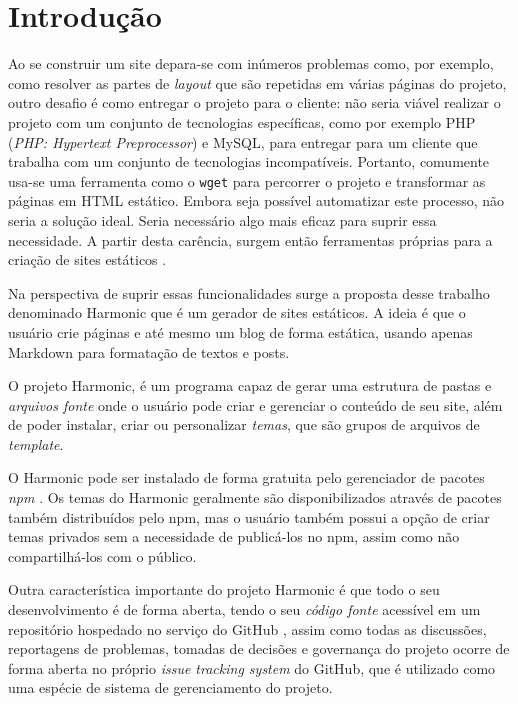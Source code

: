 \documentclass[ppginf, pep]{esinucpel}
\newcommand{\code}[1]{\texttt{#1}}
\begin{document}
\chapter{Introdução}

Ao se construir um site depara-se com inúmeros problemas como, por exemplo, como resolver as partes de \textit{layout} que são repetidas em várias páginas do projeto, outro desafio é como entregar o projeto para o cliente: não seria viável realizar o projeto com um conjunto de tecnologias específicas, como por exemplo PHP (\textit{PHP: Hypertext Preprocessor}) e MySQL, para entregar para um cliente que trabalha com um conjunto de tecnologias incompatíveis.
Portanto, comumente usa-se uma ferramenta como o \code{wget} para percorrer o projeto e transformar as páginas em HTML estático. Embora seja possível automatizar este processo, não seria a solução ideal. Seria necessário algo mais eficaz para suprir essa necessidade. A partir desta carência, surgem então ferramentas próprias para a criação de sites estáticos \cite{tableless}.


Na perspectiva de suprir essas funcionalidades surge a proposta desse trabalho  denominado Harmonic que é um gerador de sites estáticos. A ideia é que o usuário crie páginas e até mesmo um blog de forma estática, usando apenas  Markdown para formatação de textos e posts. 

O projeto Harmonic, é um programa capaz de gerar uma estrutura de pastas e \emph{arquivos fonte} onde o usuário pode criar e gerenciar o conteúdo de seu site, além de poder instalar, criar ou personalizar \emph{temas}, que são grupos de arquivos de \textit{template}.

O Harmonic pode ser instalado de forma gratuita pelo gerenciador de pacotes \emph{npm} \cite{npm}. Os temas do Harmonic geralmente são disponibilizados através de pacotes também distribuídos pelo npm, mas o usuário também possui a opção de criar temas privados sem a necessidade de publicá-los no npm, assim como não compartilhá-los com o público.

Outra característica importante do projeto Harmonic é que todo o seu desenvolvimento é de forma aberta, tendo o seu \emph{código fonte} acessível em um repositório hospedado no serviço do GitHub \cite{github}, assim como todas as discussões, reportagens de problemas, tomadas de decisões e governança do projeto ocorre de forma aberta no próprio \textit{issue tracking system} do GitHub, que é utilizado como uma espécie de sistema de gerenciamento do projeto.
\end{document}
